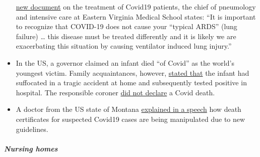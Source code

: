 \begin{itemize}
  \href{https://www.evms.edu/media/evms_public/departments/internal_medicine/EVMS_Critical_Care_COVID-19_Protocol.pdf}{new
  document} on the treatment of Covid19 patients, the chief of
  pneumology and intensive care at Eastern Virginia Medical School
  states: ``It is important to recognize that COVID-19 does not cause
  your ``typical ARDS'' (lung failure) \ldots{} this disease must be
  treated differently and it is likely we are exacerbating this
  situation by causing ventilator induced lung injury.''
\item
  In the US, a governor claimed an infant died ``of Covid'' as the
  world's youngest victim. Family acquaintances, however,
  \href{https://www.washingtonexaminer.com/news/candace-owens-accuses-connecticut-governor-of-lying-about-coronavirus-death-calls-for-resignation}{stated
  that} the infant had suffocated in a tragic accident at home and
  subsequently tested positive in hospital. The responsible coroner
  \href{https://www.dailymail.co.uk/news/article-8193487/Coroner-refuses-rule-COVID-19-cause-death-six-week-old-Connecticut-baby.html}{did
  not declare} a Covid death.
\item
  A doctor from the US state of Montana
  \href{https://www.youtube.com/watch?v=V0lIWZpiRU0}{explained in a
  speech} how death certificates for suspected Covid19 cases are being
  manipulated due to new guidelines.
\end{itemize}

\hypertarget{nursing-homes-1}{%
\subparagraph{\texorpdfstring{\textbf{Nursing
homes}}{Nursing homes}}\label{nursing-homes-1}}

